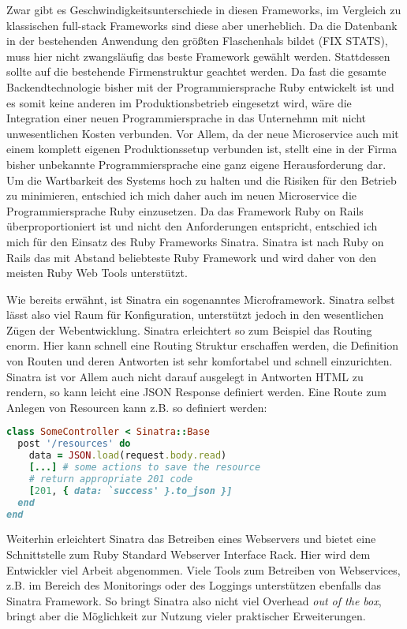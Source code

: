 Zwar gibt es Geschwindigkeitsunterschiede in diesen Frameworks\cite[vgl.][]{frameworks}, im Vergleich zu klassischen full-stack Frameworks sind diese aber unerheblich. Da die Datenbank in der bestehenden Anwendung den größten Flaschenhals bildet (FIX STATS), muss hier nicht zwangsläufig das beste Framework gewählt werden. Stattdessen sollte auf die bestehende Firmenstruktur geachtet werden. Da fast die gesamte Backendtechnologie bisher mit der Programmiersprache Ruby entwickelt ist und es somit keine anderen im Produktionsbetrieb eingesetzt wird, wäre die Integration einer neuen Programmiersprache in das Unternehmn mit nicht unwesentlichen Kosten verbunden. Vor Allem, da der neue Microservice auch mit einem komplett eigenen Produktionssetup verbunden ist, stellt eine in der Firma bisher unbekannte Programmiersprache eine ganz eigene Herausforderung dar. Um die Wartbarkeit des Systems hoch zu halten und die Risiken für den Betrieb zu minimieren, entschied ich mich daher auch im neuen Microservice die Programmiersprache Ruby einzusetzen. Da das Framework Ruby on Rails überproportioniert ist und nicht den Anforderungen entspricht, entschied ich mich für den Einsatz des Ruby Frameworks Sinatra. 
Sinatra ist nach Ruby on Rails das mit Abstand beliebteste Ruby Framework\cite[vgl.][]{ruby2015} und wird daher von den meisten Ruby Web Tools unterstützt.

Wie bereits erwähnt, ist Sinatra ein sogenanntes Microframework. Sinatra selbst lässt also viel Raum für Konfiguration, unterstützt jedoch in den wesentlichen Zügen der Webentwicklung. Sinatra erleichtert so zum Beispiel das Routing enorm. Hier kann schnell eine Routing Struktur erschaffen werden, die Definition von Routen und deren Antworten ist sehr komfortabel und schnell einzurichten. Sinatra ist vor Allem auch nicht darauf ausgelegt in Antworten HTML zu rendern, so kann leicht eine JSON Response definiert werden.
Eine Route zum Anlegen von Resourcen kann z.B. so definiert werden:
\begin{lstlisting}[language=Ruby]
class SomeController < Sinatra::Base
  post '/resources' do
    data = JSON.load(request.body.read)
    [...] # some actions to save the resource
    # return appropriate 201 code
    [201, { data: `success' }.to_json }]
  end
end
\end{lstlisting}

Weiterhin erleichtert Sinatra das Betreiben eines Webservers und bietet eine Schnittstelle zum Ruby Standard Webserver Interface Rack\cite{rack}. Hier wird dem Entwickler viel Arbeit abgenommen. Viele Tools zum Betreiben von Webservices, z.B. im Bereich des Monitorings oder des Loggings unterstützen ebenfalls das Sinatra Framework. So bringt Sinatra also nicht viel Overhead \textit{out of the box}, bringt aber die Möglichkeit zur Nutzung vieler praktischer Erweiterungen.


